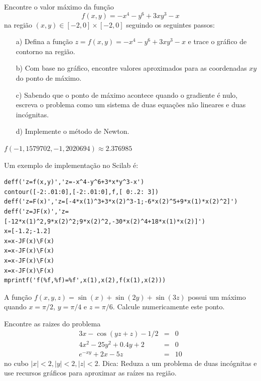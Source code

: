  
 
 \begin{exer}Encontre o valor máximo da função $$f(x,y)=-x^4-y^6+3xy^3-x$$ na região $(x,y)\in [-2,0]\times [-2,0]$
 seguindo os seguintes passos:
\begin{itemize}
  \item[a)] Defina a função $z=f(x,y)=-x^4-y^6+3xy^3-x$ e trace o gráfico de contorno na região. 
  \item[b)] Com base no gráfico, encontre valores aproximados para as coordenadas $xy$ do ponto de máximo.
  \item[c)] Sabendo que o ponto de máximo acontece quando o gradiente é nulo, escreva o problema como um sistema de duas equações não lineares e duas incógnitas.
  \item[d)] Implemente o método de Newton.
\end{itemize}
\end{exer}
 \begin{resp}
 $f(-1,1579702, -1,2020694)\approx 2.376985$

\ifisscilab
Um exemplo de implementação no Scilab é:
\begin{verbatim}
deff('z=f(x,y)','z=-x^4-y^6+3*x*y^3-x')
contour([-2:.01:0],[-2:.01:0],f,[ 0:.2: 3])
deff('z=F(x)','z=[-4*x(1)^3+3*x(2)^3-1;-6*x(2)^5+9*x(1)*x(2)^2]')
deff('z=JF(x)','z=[-12*x(1)^2,9*x(2)^2;9*x(2)^2,-30*x(2)^4+18*x(1)*x(2)]')
x=[-1.2;-1.2]
x=x-JF(x)\F(x)
x=x-JF(x)\F(x)
x=x-JF(x)\F(x)
x=x-JF(x)\F(x)
mprintf('f(%f,%f)=%f',x(1),x(2),f(x(1),x(2)))
\end{verbatim}
\fi
\end{resp} 

 
 
 \begin{exer}A função $f(x,y,z)=\sin(x)+\sin(2y)+\sin(3z)$ possui um máximo quando $x=\pi/2$, $y=\pi/4$ e $z=\pi/6$. Calcule numericamente este ponto.
 \end{exer}

 
 \begin{exer}\label{prob_sis3} Encontre as raizes do problema
 \begin{eqnarray*}
 3x-\cos(yz+z)-1/2&=&0\\
 4x^2-25y^2+0.4y+2&=&0\\
 e^{-xy}+2x-5z&=&10
 \end{eqnarray*}
 no cubo $|x|<2, |y|<2, |z|<2.$
 Dica: Reduza a um problema de duas incógnitas e use recursos gráficos para aproximar as raízes na região.
 \end{exer}
 
